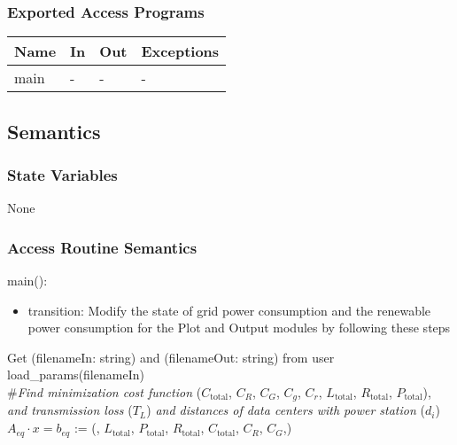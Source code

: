 \documentclass[12pt, titlepage]{article}
\begin{document}
\subsubsection{Exported Access Programs}

\begin{center}
\begin{tabular}{p{2cm} p{4cm} p{4cm} p{2cm}}
\hline
\textbf{Name} & \textbf{In} & \textbf{Out} & \textbf{Exceptions} \\
\hline
main & - & - & - \\
\hline
\end{tabular}
\end{center}

\subsection{Semantics}

\subsubsection{State Variables}

None

\subsubsection{Access Routine Semantics}

\noindent main():
\begin{itemize}
\item transition: Modify the state of grid power consumption and the renewable power consumption for the Plot and Output modules by following these steps\\
\end{itemize}

\noindent Get (filenameIn: string) and (filenameOut: string) from user\\

\noindent load\_params(filenameIn)\\

\noindent \#\textit{Find minimization cost function} ($C_\text{total}$,
  $C_R$, $C_G$, $C_g$, $C_r$, $L_\text{total}$, $R_\text{total}$, $P_\text{total}$), \textit{and transmission loss} ($T_L$) \textit{and distances of data centers with power station} ($d_i$)\\

\noindent $A_{eq} \cdot x = b_{eq}$ := (, $L_\text{total}$,
$P_\text{total}$, $R_\text{total}$, $C_\text{total}$, $C_R$, $C_G$,)\\
\end{document}
